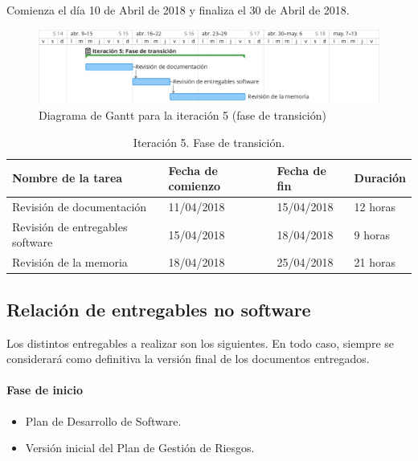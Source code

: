 \documentclass[twoside]{report}
\begin{document}
Comienza el día 10 de Abril de 2018 y finaliza el 30 de Abril de 2018.

\begin{figure}[h]
\begin{center}
\includegraphics[width=\textwidth]{images/gantt/ite5}
\caption{Diagrama de Gantt para la iteración 5 (fase de transición)}
\end{center}
\end{figure}


\begin{table}[H]
\centering
\begin{tabular}{|l|l|l|l|}
\hline
Nombre de la tarea              & Fecha de comienzo & Fecha de fin & Duración \\ \hline
Revisión de documentación       & 11/04/2018        & 15/04/2018   & 12 horas   \\ \hline
Revisión de entregables software & 15/04/2018        & 18/04/2018   & 9 horas   \\ \hline
Revisión de la memoria & 18/04/2018        & 25/04/2018   & 21 horas   \\ \hline
\end{tabular}
\caption{Iteración 5. Fase de transición.}
\end{table}

\subsection{Relación de entregables no software}

Los distintos entregables a realizar son los siguientes. En todo caso, siempre se considerará como definitiva la versión final de los documentos entregados.
\paragraph{Fase de inicio\\}
\begin{itemize}
\item Plan de Desarrollo de Software.
\item Versión inicial del Plan de Gestión de Riesgos.
\end{itemize}
\end{document}
